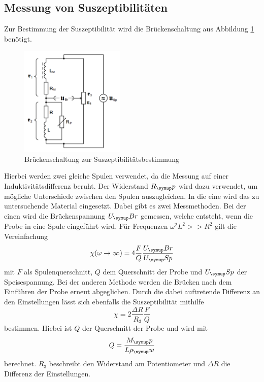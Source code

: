 \subsection{Messung von Suszeptibilitäten}
Zur Bestimmung der Suszeptibilität wird die Brückenschaltung aus Abbildung
\ref{fig:schaltung} benötigt.
\begin{figure}
  \centering
  \includegraphics[width=5cm]{bilder/schaltung.png}
  \caption{Brückenschaltung zur Suszeptibilitätsbestimmung \cite{606}}
  \label{fig:schaltung}
\end{figure}
Hierbei werden zwei gleiche Spulen verwendet, da die Messung auf einer
Induktivitätsdifferenz beruht. Der Widerstand $R_\su{p}$ wird dazu verwendet,
um mögliche Unterschiede zwischen den Spulen auszugleichen. In die eine wird das
zu untersuchende
Material eingesetzt. Dabei gibt es zwei Messmethoden. Bei der einen wird die
Brückenspannung $U_\su{Br}$ gemessen, welche entsteht, wenn die Probe in eine
Spule eingeführt wird. Für Frequenzen $\omega^2L^2 >>R^2$ gilt die Vereinfachung
\begin{equation}
 \chi (\omega \to \infty) = 4 \frac{F}{Q}\frac{U_\su{Br}}{U_\su{Sp}}
\end{equation}
mit $F$ als Spulenquerschnitt, $Q$ dem Querschnitt der Probe und $U_\su{Sp}$ der
Speisespannung.
Bei der anderen Methode werden die Brücken nach dem Einführen der Probe erneut
abgeglichen. Durch die dabei auftretende Differenz an den Einstellungen
lässt sich ebenfalls die Suszeptibilität mithilfe
\begin{equation}
 \chi = 2\frac{\Delta R}{R_3}\frac{F}{Q}
 \label{eqn:suszep}
\end{equation}
bestimmen. Hiebei ist $Q$ der Querschnitt der Probe und wird mit
\begin{equation}
  Q=\frac{M_\su{p}}{L\rho_\su{w}}
\end{equation}
berechnet.
 $R_3$ beschreibt den Widerstand am Potentiometer und $\Delta R$ die
Differenz der Einstellungen.

